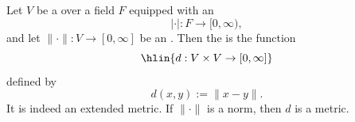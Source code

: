\begin{definition} \label{definition:extended_metric_induced_by_an_extended_norm_on_a_vector_space_over_a_field_with_absolute_value}
    Let \( V \) be a  over a field \( F \) equipped with an 
    \[
    |\cdot| : F \to [0, \infty),
    \]
    and let \( \|\cdot\| : V \to [0, \infty] \) be an .  
    Then the  is the function
    $$\hlin{d : V \times V \to [0, \infty]}$$
    defined by
    \[
    d(x, y) := \|x - y\|.
    \]
    It is indeed an extended metric. If $\|\cdot\|$ is a norm, then $d$ is a metric.
\end{definition}